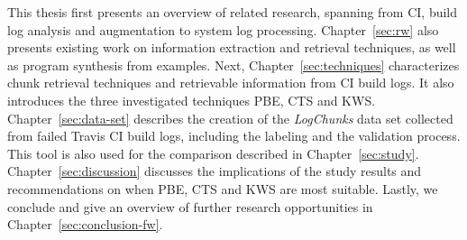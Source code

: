 \documentclass[\myrootdir/main.tex]{subfiles}
\begin{document}
This thesis first presents an overview of related research, spanning from CI, build log analysis and augmentation to system log processing.
Chapter~\ref{sec:rw} also presents existing work on information extraction and retrieval techniques, as well as program synthesis from examples.
Next, Chapter~\ref{sec:techniques} characterizes chunk retrieval techniques and retrievable information from CI build logs.
It also introduces the three investigated techniques PBE, CTS and KWS\@.
Chapter~\ref{sec:data-set} describes the creation of the \emph{LogChunks} data set collected from failed Travis CI build logs, including the labeling and the validation process.
This tool is also used for the comparison described in Chapter~\ref{sec:study}.
Chapter~\ref{sec:discussion} discusses the implications of the study results and recommendations on when PBE, CTS and KWS are most suitable.
Lastly, we conclude and give an overview of further research opportunities in Chapter~\ref{sec:conclusion-fw}.%




\end{document}
